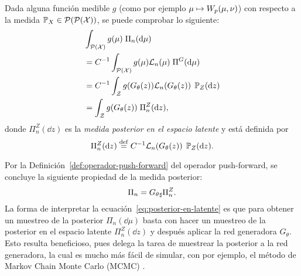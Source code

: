 Dada alguna función medible $g$ (como por ejemplo $\mu \mapsto \Wasserstein[p]{\mu}{\nu} $) con respecto a la medida $\Prob_X \in \ProbSpace[\ProbSpace[\cX]]$, se puede comprobar lo siguiente:
\begin{align}
     & \int_{\ProbSpace[\cX]} g(\mu) \; \Pi_n(\dd \mu)                         \\
     & = C^{-1} \int_{\ProbSpace[\cX]} g(\mu) \cL_n(\mu) \; \Pi^G(\dd \mu)     \\
     & = C^{-1} \int_{\cZ} g(G_\theta(z)) \cL_n(G_\theta(z)) \; \Prob_Z(\dd z) \\
     & = \int_{\cZ} g(G_\theta(z)) \; \Pi^Z_n(\dd z),
\end{align}
donde $\Pi^Z_n(\dd z)$ es la \textit{medida posterior en el espacio latente} y está definida por
\begin{equation}
    \Pi^Z_n(\dd z) \eqdef C^{-1} \cL_n(G_\theta(z)) \; \Prob_Z(\dd z).
\end{equation}

Por la Definición~\ref{def:operador-push-forward} del operador push-forward, se concluye la siguiente propiedad de la medida posterior:
\begin{equation}\label{eq:posterior-en-latente}
    \Pi_n = \pf{G_\theta} \Pi^Z_n.
\end{equation}
La forma de interpretar la ecuación~\eqref{eq:posterior-en-latente} es que para obtener un muestreo de la posterior $\Pi_n(\dd \mu)$ basta con hacer un muestreo de la posterior en el espacio latente $\Pi^Z_n(\dd z)$ y después aplicar la red generadora $G_\theta$. Esto resulta beneficioso, pues delega la tarea de muestrear la posterior a la red generadora, la cual es mucho más fácil de simular, con por ejemplo, el método de Markov Chain Monte Carlo (MCMC) \cite{andrieu2003introduction,brooks2011handbook,goodman2010ensemble}.









